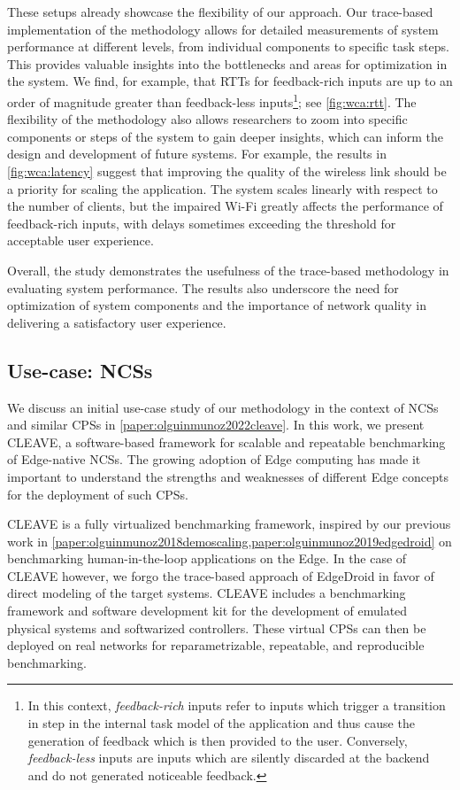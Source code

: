 These setups already showcase the flexibility of our approach.
Our trace-based implementation of the methodology allows for detailed measurements of system performance at different levels, from individual components to specific task steps.
This provides valuable insights into the bottlenecks and areas for optimization in the system.
We find, for example, that \glspl{RTT} for feedback-rich inputs are up to an order of magnitude greater than feedback-less inputs\footnote{%
    In this context, \emph{feedback-rich} inputs refer to inputs which trigger a transition in step in the internal task model of the application and thus cause the generation of feedback which is then provided to the user.
    Conversely, \emph{feedback-less} inputs are inputs which are silently discarded at the backend and do not generated noticeable feedback.
}; see \cref{fig:wca:rtt}.
The flexibility of the methodology also allows researchers to zoom into specific components or steps of the system to gain deeper insights, which can inform the design and development of future systems.
For example, the results in \cref{fig:wca:latency} suggest that improving the quality of the wireless link should be a priority for scaling the application.
The system scales linearly with respect to the number of clients, but the impaired Wi-Fi greatly affects the performance of feedback-rich inputs, with delays sometimes exceeding the threshold for acceptable user experience.

Overall, the study demonstrates the usefulness of the trace-based methodology in evaluating system performance.
The results also underscore the need for optimization of system components and the importance of network quality in delivering a satisfactory user experience.

\subsection{Use-case: \acsp{NCS}}\label{summary:methodology:usecase_ncs}

We discuss an initial use-case study of our methodology in the context of \glspl{NCS} and similar \glspl{CPS} in \cref{paper:olguinmunoz2022cleave}.
In this work, we present \gls{CLEAVE}, a software-based framework for scalable and repeatable benchmarking of Edge-native \aclp{NCS}.
The growing adoption of Edge computing has made it important to understand the strengths and weaknesses of different Edge concepts for the deployment of such \glspl{CPS}.

\gls{CLEAVE} is a fully virtualized benchmarking framework, inspired by our previous work in \cref{paper:olguinmunoz2018demoscaling,paper:olguinmunoz2019edgedroid} on benchmarking human-in-the-loop applications on the Edge.
In the case of \gls{CLEAVE} however, we forgo the trace-based approach of EdgeDroid in favor of direct modeling of the target systems.
\gls{CLEAVE} includes a benchmarking framework and software development kit for the development of emulated physical systems and softwarized controllers.
These virtual \glspl{CPS} can then be deployed on real networks for reparametrizable, repeatable, and reproducible benchmarking.

